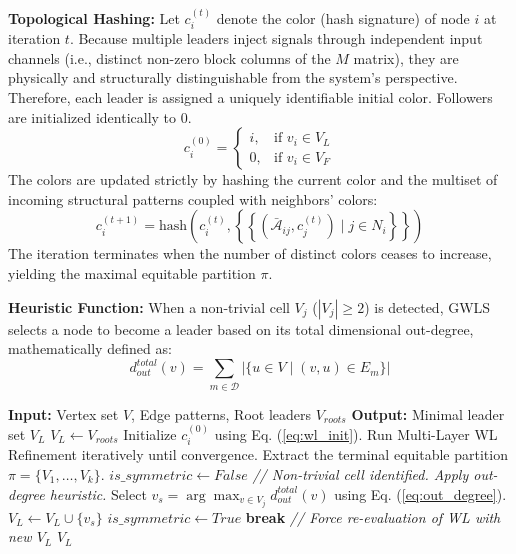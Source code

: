 \documentclass{IEEEtran}
\begin{document}
	\textbf{Topological Hashing:} Let $c_i^{(t)}$ denote the color (hash signature) of node $i$ at iteration $t$. Because multiple leaders inject signals through independent input channels (i.e., distinct non-zero block columns of the $M$ matrix), they are physically and structurally distinguishable from the system's perspective. Therefore, each leader is assigned a uniquely identifiable initial color. Followers are initialized identically to 0.
	\begin{equation}
		c_i^{(0)} = \begin{cases} i, & \text{if } v_i \in V_L \\ 0, & \text{if } v_i \in V_F \end{cases} \label{eq:wl_init}
	\end{equation}
	The colors are updated strictly by hashing the current color and the multiset of incoming structural patterns coupled with neighbors' colors:
	\begin{equation}
		c_i^{(t+1)} = \text{hash}\left( c_i^{(t)}, \left\{\!\!\left\{ \left( \bar{\mathcal{A}}_{ij}, c_j^{(t)} \right) \mid j \in N_i \right\}\!\!\right\} \right)
	\end{equation}
	The iteration terminates when the number of distinct colors ceases to increase, yielding the maximal equitable partition $\pi$.
	
	\textbf{Heuristic Function:} When a non-trivial cell $V_j$ ($|V_j| \ge 2$) is detected, GWLS selects a node to become a leader based on its total dimensional out-degree, mathematically defined as:
	\begin{equation}
		d_{out}^{total}(v) = \sum_{m \in \mathcal{D}} \left| \{u \in V \mid (v,u) \in E_m\} \right| \label{eq:out_degree}
	\end{equation}
	
	\begin{algorithm}[htbp]
		\caption{Greedy WL-Based Selection (GWLS)}
		\label{alg:gwls}
		\begin{algorithmic}[1]
			\STATE \textbf{Input:} Vertex set $V$, Edge patterns, Root leaders $V_{roots}$
			\STATE \textbf{Output:} Minimal leader set $V_L$
			\STATE $V_L \leftarrow V_{roots}$
			\REPEAT
			\STATE Initialize $c_i^{(0)}$ using Eq. (\ref{eq:wl_init}).
			\STATE Run Multi-Layer WL Refinement iteratively until convergence.
			\STATE Extract the terminal equitable partition $\pi = \{V_1, \dots, V_k\}$.
			\STATE $is\_symmetric \leftarrow False$
			\STATE \textit{// Non-trivial cell identified. Apply out-degree heuristic.}
			\STATE Select $v_s = \arg\max_{v \in V_j} d_{out}^{total}(v)$ using Eq. (\ref{eq:out_degree}).
			\STATE $V_L \leftarrow V_L \cup \{v_s\}$
			\STATE $is\_symmetric \leftarrow True$
			\STATE \textbf{break} \textit{// Force re-evaluation of WL with new $V_L$}
			\ENDIF
			\ENDFOR
			\RETURN $V_L$
		\end{algorithmic}
	\end{algorithm}
	
\end{document}
